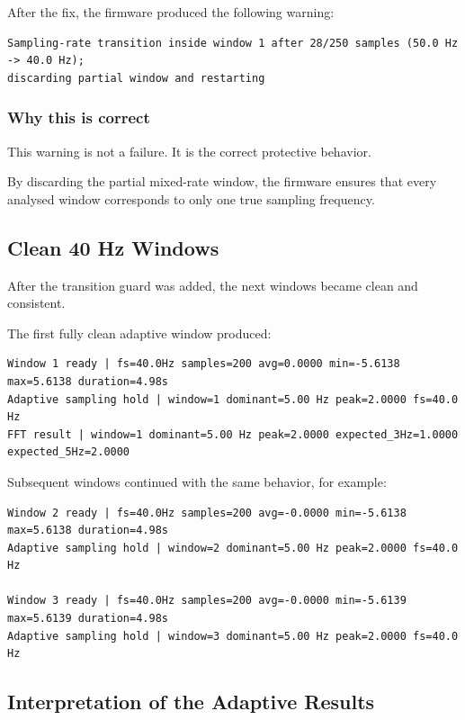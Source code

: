 \documentclass[12pt,a4paper]{article}
\begin{document}
After the fix, the firmware produced the following warning:

\begin{lstlisting}
Sampling-rate transition inside window 1 after 28/250 samples (50.0 Hz -> 40.0 Hz);
discarding partial window and restarting
\end{lstlisting}

\subsubsection*{Why this is correct}

This warning is not a failure. It is the correct protective behavior.

By discarding the partial mixed-rate window, the firmware ensures that every
analysed window corresponds to only one true sampling frequency.

\subsection{Clean 40 Hz Windows}

After the transition guard was added, the next windows became clean and
consistent.

The first fully clean adaptive window produced:

\begin{lstlisting}
Window 1 ready | fs=40.0Hz samples=200 avg=0.0000 min=-5.6138 max=5.6138 duration=4.98s
Adaptive sampling hold | window=1 dominant=5.00 Hz peak=2.0000 fs=40.0 Hz
FFT result | window=1 dominant=5.00 Hz peak=2.0000 expected_3Hz=1.0000 expected_5Hz=2.0000
\end{lstlisting}

Subsequent windows continued with the same behavior, for example:

\begin{lstlisting}
Window 2 ready | fs=40.0Hz samples=200 avg=-0.0000 min=-5.6138 max=5.6138 duration=4.98s
Adaptive sampling hold | window=2 dominant=5.00 Hz peak=2.0000 fs=40.0 Hz

Window 3 ready | fs=40.0Hz samples=200 avg=-0.0000 min=-5.6139 max=5.6139 duration=4.98s
Adaptive sampling hold | window=3 dominant=5.00 Hz peak=2.0000 fs=40.0 Hz
\end{lstlisting}

\subsection{Interpretation of the Adaptive Results}
\end{document}
